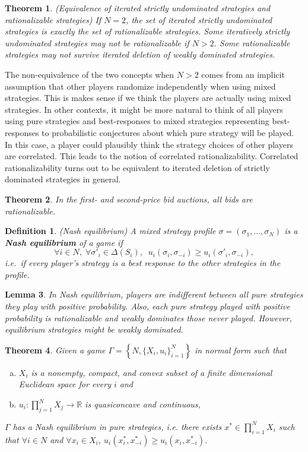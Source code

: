\documentclass[letter, 10pt]{article}
\newtheorem{definition}{Definition}[section]
\newtheorem{theorem}{Theorem}[section]
\newtheorem{lemma}[theorem]{Lemma}
\newcommand{\R}{\mathbb{R}}
\begin{document}
\begin{spacing}{1.1}
\begin{theorem}
  (Equivalence of iterated strictly undominated strategies and
  rationalizable strategies) If $N=2$, the set of iterated strictly
  undominated strategies is exactly the set of rationalizable
  strategies. Some iteratively strictly undominated strategies may not be
  rationalizable if $N>2$. Some rationalizable strategies may not survive
  iterated deletion of weakly dominated strategies.
\end{theorem}

The non-equivalence of the two concepts when $N>2$ comes from an implicit
assumption that other players randomize independently when using mixed
strategies. This is makes sense if we think the players are
actually using mixed strategies. In other contexts, it might be more
natural to think of all players using pure strategies and best-responses to
mixed strategies representing best-responses to probabilistic conjectures
about which pure strategy will be played. In this case, a player could
plausibly think the strategy choices of other players are correlated. This
leads to the notion of correlated rationalizability. Correlated
rationalizability turns out to be equivalent to iterated deletion of
strictly dominated strategies in general.

\begin{theorem}
  In the first- and second-price bid auctions, all bids are rationalizable.
\end{theorem}

\begin{definition}
  (Nash equilibrium) A mixed strategy profile $\sigma = \left(\sigma_1,
    \ldots, \sigma_N\right)$ is a \textbf{Nash equilibrium} of a game
  if \[\forall i \in N,\; \forall \sigma'_i\in \Delta(S_i),\;\;
  u_i(\sigma_i, \sigma_{-i}) \geq u_i(\sigma'_i, \sigma_{-i}),\] i.e.~if
  every player's strategy is a best response to the other strategies in the
  profile.
\end{definition}

\begin{lemma}
  In Nash equilibrium, players are indifferent between all pure strategies
  they play with positive probability. Also, each pure strategy played with
  positive probability is rationalizable and weakly dominates those never
  played. However, equilibrium strategies might be weakly dominated.
\end{lemma}

\begin{theorem}
  Given a game $\Gamma = \left\{N, \{X_i, u_i\}_{i=1}^N\right\}$ in normal
  form such that
  \begin{enumerate}[a)]
  \item $X_i$ is a nonempty, compact, and convex subset of a finite
    dimensional Euclidean space for every $i$ and
  \item $u_i : \prod_{j=1}^N X_j \to \R$ is quasiconcave and continuous,
  \end{enumerate}
  $\Gamma$ has a Nash equilibrium in pure strategies, i.e. there exists
  $x^* \in \prod_{i=1}^N X_i$ such that $\forall i \in N$ and $\forall
  x_i\in X_i$, $ u_i(x_i^*, x_{-i}^*) \geq u_i(x_i, x_{-i}^*)$.
\end{theorem}


\end{spacing}
\end{document}
